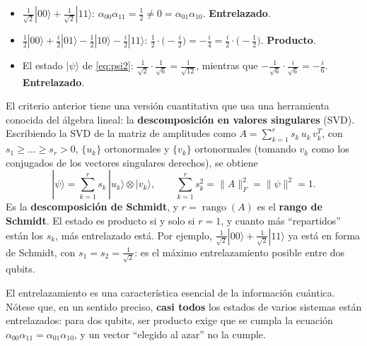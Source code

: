 \documentclass[11pt, a4paper, twoside, openright]{report}
\begin{document}
\begin{tcolorbox}[colback=cyan!5!white,colframe=cyan!75!black,title=\textbf{Ejemplos: Aplicando el criterio}]
\begin{itemize}
    \item $\frac{1}{\sqrt2}|00\rangle + \frac{1}{\sqrt2}|11\rangle$: \; $\alpha_{00}\alpha_{11} = \frac12 \neq 0 = \alpha_{01}\alpha_{10}$. \textbf{Entrelazado}.
    \item $\frac12|00\rangle + \frac{i}{2}|01\rangle - \frac12|10\rangle - \frac{i}{2}|11\rangle$: \; $\frac12\cdot\big(-\frac{i}{2}\big) = -\frac{i}{4} = \frac{i}{2}\cdot\big(-\frac12\big)$. \textbf{Producto}.
    \item El estado $|\psi\rangle$ de \eqref{eq:psi2}: \; $\frac{1}{\sqrt2}\cdot\frac{1}{\sqrt6} = \frac{1}{\sqrt{12}}$, mientras que $-\frac{1}{\sqrt6}\cdot\frac{i}{\sqrt6} = -\frac{i}{6}$. \textbf{Entrelazado}.
\end{itemize}
\end{tcolorbox}

\begin{tcolorbox}[colback=blue!5!white,colframe=blue!75!black,title=\textbf{Nota Teórica (opcional): Descomposición de Schmidt y valores singulares}]
El criterio anterior tiene una versión cuantitativa que usa una herramienta conocida del álgebra lineal: la \textbf{descomposición en valores singulares} (SVD). Escribiendo la SVD de la matriz de amplitudes como $A = \sum_{k=1}^{r} s_k\, u_k\, v_k^T$, con $s_1 \ge \dots \ge s_r > 0$, $\{u_k\}$ ortonormales y $\{v_k\}$ ortonormales (tomando $v_k$ como los conjugados de los vectores singulares derechos), se obtiene
\[ |\psi\rangle = \sum_{k=1}^{r} s_k\, |u_k\rangle\otimes|v_k\rangle, \qquad \sum_{k=1}^r s_k^2 = \|A\|_F^2 = \|\psi\|^2 = 1. \]
Es la \textbf{descomposición de Schmidt}, y $r = \operatorname{rango}(A)$ es el \textbf{rango de Schmidt}. El estado es producto si y solo si $r = 1$, y cuanto más ``repartidos'' están los $s_k$, más entrelazado está. Por ejemplo, $\frac{1}{\sqrt2}|00\rangle + \frac{1}{\sqrt2}|11\rangle$ ya está en forma de Schmidt, con $s_1 = s_2 = \frac{1}{\sqrt2}$: es el máximo entrelazamiento posible entre dos qubits.
\end{tcolorbox}

\noindent El entrelazamiento es una característica esencial de la información cuántica. Nótese que, en un sentido preciso, \textbf{casi todos} los estados de varios sistemas están entrelazados: para dos qubits, ser producto exige que se cumpla la ecuación $\alpha_{00}\alpha_{11} = \alpha_{01}\alpha_{10}$, y un vector ``elegido al azar'' no la cumple.
\end{document}
